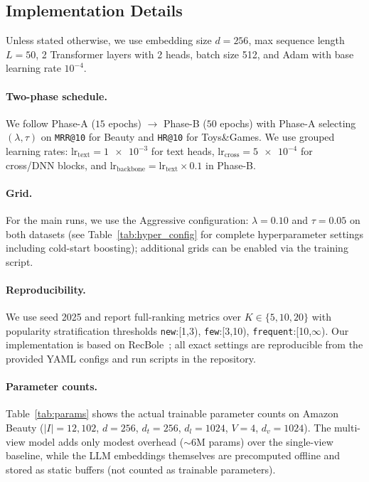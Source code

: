 \documentclass[sigconf,natbib=true]{acmart}
\newcommand{\llm}{\textsc{LLM}\xspace}
\begin{document}
\subsection{Implementation Details}
Unless stated otherwise, we use embedding size $d=256$, max
sequence length $L=50$, 2 Transformer layers with 2 heads,
batch size 512, and Adam with base learning rate $10^{-4}$.
\paragraph{Two-phase schedule.}
We follow Phase-A ($15$ epochs) $\rightarrow$ Phase-B ($50$
epochs) with Phase-A selecting $(\lambda,\tau)$ on
\texttt{MRR@10} for Beauty and \texttt{HR@10} for Toys\&Games.
We use grouped learning rates:
$\text{lr}_{\text{text}}=\num{1e-3}$ for text heads,
$\text{lr}_{\text{cross}}=\num{5e-4}$ for cross/DNN blocks,
and $\text{lr}_{\text{backbone}}=\text{lr}_{\text{text}}\times
0.1$ in Phase-B.
\paragraph{Grid.}
For the main runs, we use the Aggressive configuration:
$\lambda=0.10$ and $\tau=0.05$ on both datasets
(see Table~\ref{tab:hyper_config} for complete hyperparameter
settings including cold-start boosting); additional grids can
be enabled via the training script.
\paragraph{Reproducibility.}
We use seed 2025 and report full-ranking metrics over
$K\in\{5,10,20\}$ with popularity stratification thresholds
\texttt{new}:[1,3), \texttt{few}:[3,10),
\texttt{frequent}:[10,$\infty$). Our implementation is based on
RecBole~\cite{zhao2021recbole}; all exact settings are
reproducible from the provided YAML configs and run scripts
in the repository.

\paragraph{Parameter counts.}
Table~\ref{tab:params} shows the actual trainable parameter
counts on Amazon Beauty ($|I|=12,102$, $d=256$, $d_t=256$,
$d_l=1024$, $V=4$, $d_v=1024$).
The multi-view model adds only modest overhead (${\sim}6$M
params) over the single-view baseline, while the \llm
embeddings themselves are precomputed offline and stored as
static buffers (not counted as trainable parameters).
\end{document}
